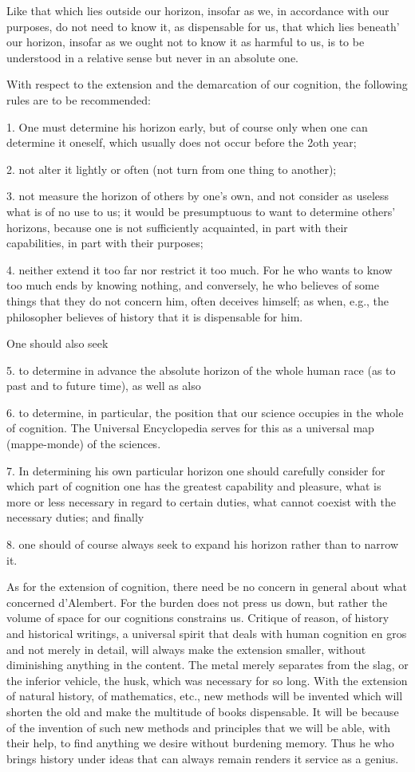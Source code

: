 Like that which lies outside our horizon, insofar as we, in accordance
with our purposes, do not need to know it, as dispensable for us, that which
lies beneath' our horizon, insofar as we ought not to know it as harmful to
us, is to be understood in a relative sense but never in an absolute one.

With respect to the extension and the demarcation of our cognition,
the following rules are to be recommended:

1. One must determine his horizon early,
but of course only when one can determine it oneself,
which usually does not occur before the 2oth year;

2. not alter it lightly or often
(not turn from one thing to another);

3. not measure the horizon of others by one's own,
and not consider as useless what is of no use to us;
it would be presumptuous to want to determine others' horizons,
because one is not sufficiently acquainted,
in part with their capabilities,
in part with their purposes;

4. neither extend it too far nor restrict it too much.
For he who wants to know too much ends by knowing nothing,
and conversely, he who believes of some things
that they do not concern him, often deceives himself;
as when, e.g., the philosopher believes of history
that it is dispensable for him.

One should also seek

5. to determine in advance the absolute horizon of
the whole human race (as to past and to future time),
as well as also

6. to determine, in particular, the position that
our science occupies in the whole of cognition.
The Universal Encyclopedia serves for this as
a universal map (mappe-monde) of the sciences.

7. In determining his own particular horizon one should carefully consider for
which part of cognition one has the greatest capability and pleasure, what is
more or less necessary in regard to certain duties, what cannot coexist with
the necessary duties; and finally

8. one should of course always seek
to expand his horizon rather than to narrow it.

As for the extension of cognition, there need be no concern in general
about what concerned d'Alembert.
For the burden does not press us down, but rather the volume of space
for our cognitions constrains us.
Critique of reason, of history and historical writings,
a universal spirit that deals with human cognition en gros and
not merely in detail, will always make the extension smaller,
without diminishing anything in the content.
The metal merely separates from the slag, or the inferior vehicle,
the husk, which was necessary for so long.
With the extension of natural history, of mathematics, etc.,
new methods will be invented which will shorten the old and
make the multitude of books dispensable.
It will be because of the invention of such new methods and principles
that we will be able, with their help, to find anything we desire
without burdening memory.
Thus he who brings history under ideas that can always remain
renders it service as a genius.

